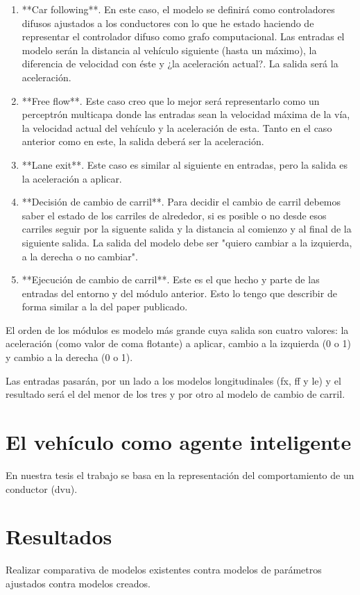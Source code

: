 \begin{enumerate}
	\item **Car following**. En este caso, el modelo se definirá como controladores difusos ajustados a los conductores con lo que he estado haciendo de representar el controlador difuso como grafo computacional. Las entradas el modelo serán la distancia al vehículo siguiente (hasta un máximo), la diferencia de velocidad con éste y ¿la aceleración actual?. La salida será la aceleración.
	\item **Free flow**. Este caso creo que lo mejor será representarlo como un perceptrón multicapa donde las entradas sean la velocidad máxima de la vía, la velocidad actual del vehículo y la aceleración de esta. Tanto en el caso anterior como en este, la salida deberá ser la aceleración.
	\item **Lane exit**. Este caso es similar al siguiente en entradas, pero la salida es la aceleración a aplicar.
	\item **Decisión de cambio de carril**. Para decidir el cambio de carril debemos saber el estado de los carriles de alrededor, si es posible o no desde esos carriles seguir por la siguente salida y la distancia al comienzo y al final de la siguiente salida. La salida del modelo debe ser "quiero cambiar a la izquierda, a la derecha o no cambiar".
	\item **Ejecución de cambio de carril**. Este es el que hecho y parte de las entradas del entorno y del módulo anterior. Esto lo tengo que describir de forma similar a la del paper publicado.
\end{enumerate}

El orden de los módulos es modelo más grande cuya salida son cuatro valores: la aceleración (como valor de coma flotante) a aplicar, cambio a la izquierda (0 o 1) y cambio a la derecha (0 o 1).

Las entradas pasarán, por un lado a los modelos longitudinales (fx, ff y le) y el resultado será el del menor de los tres y por otro al modelo de cambio de carril.

\section{El vehículo como agente inteligente}

En nuestra tesis el trabajo se basa en la representación del comportamiento de un conductor (\gls{dvu}).

\section{Resultados}
\label{ch:behavior-models-study:results}

Realizar comparativa de modelos existentes contra modelos de parámetros ajustados contra modelos creados.